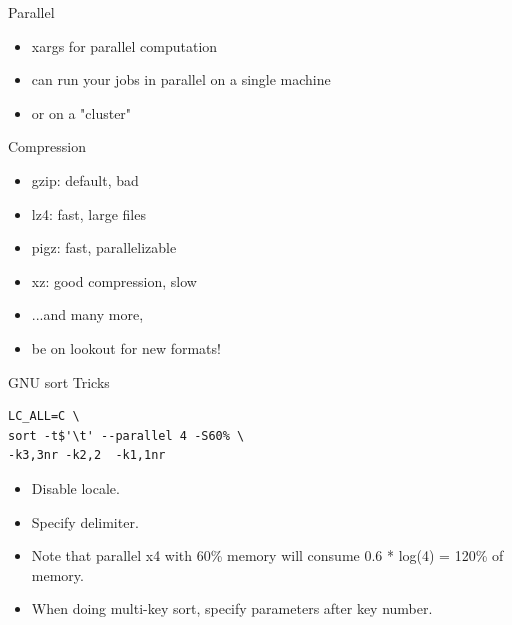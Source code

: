 \documentclass[handout]{beamer}
\begin{document}

\begin{frame}{Parallel}

\begin{itemize}
\item xargs for parallel computation
\item can run your jobs in parallel on a single machine
\item or on a "cluster"
\end{itemize}

\end{frame}


\begin{frame}{Compression}

\begin{itemize}
\item gzip: default, bad
\item lz4: fast, large files
\item pigz: fast, parallelizable
\item xz: good compression, slow
\item ...and many more,
\item be on lookout for new formats!
\end{itemize}

\end{frame}


\begin{frame}[fragile]{GNU sort Tricks}

\begin{verbatim}
LC_ALL=C \
sort -t$'\t' --parallel 4 -S60% \
-k3,3nr -k2,2  -k1,1nr
\end{verbatim}

\begin{itemize}
\item Disable locale.
\item Specify delimiter.
\item Note that parallel x4 with 60\% memory
      will consume 0.6 * log(4) = 120\% of memory.
\item When doing multi-key sort, specify parameters after key number.
\end{itemize}

\end{frame}
\end{document}
